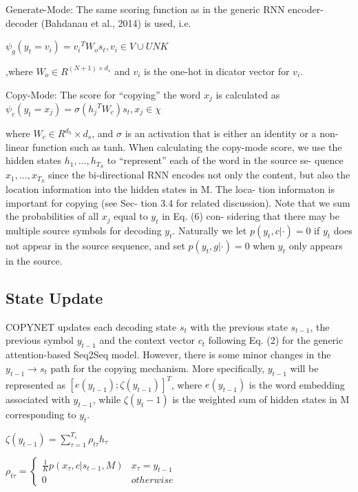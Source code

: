 \documentclass[UTF8]{ctexart}
\begin{document}
    Generate-Mode: The same scoring function as
    in the generic RNN encoder-decoder (Bahdanau et al., 2014) is used, i.e.
    
    $\psi_g(y_t = v_i) = {v_i}^T  W_o s_t, v_i \in  V \cup UNK $
    
    ,where $ W_o \in R^{(N+1)×d_s} $ and $v_i$  is the one-hot in dicator vector for $v_i$.

    Copy-Mode: The score for “copying” the word $x_j$ is calculated as
    $  \psi_c(y_t = x_j) = \sigma({h_j}^TW_c)s_t,x_j \in \chi    $

    where $W_c \in R^{d_h}×d_s$, and $\sigma$ is an activation
    that is either an identity or a non-linear function
    such as tanh. When calculating the copy-mode
    score, we use the hidden states ${h_1, ..., h_{T_S}}$ to
    “represent” each of the word in the source se-
    quence ${x_1, ..., x_{T_S}}$ since the bi-directional RNN
    encodes not only the content, but also the location
    information into the hidden states in M. The loca-
    tion informaton is important for copying (see Sec-
    tion 3.4 for related discussion). Note that we sum
    the probabilities of all $x_j$ equal to $y_t$ in Eq. (6) con-
    sidering that there may be multiple source symbols
    for decoding $y_t$. Naturally we let $p(y_t, c|·) = 0 $ if
    $y_t$ does not appear in the source sequence, and set
    $p(y_t, g|·) = 0$ when $y_t$ only appears in the source.


    \subsection{State Update}

    COPYNET updates each decoding state $s_t$ with
    the previous state $s_{t−1}$, the previous symbol $y_{t−1}$
    and the context vector $c_t$ following Eq. (2) for the
    generic attention-based Seq2Seq model. However,
    there is some minor changes in the $y_{t−1}→s_t$ path
    for the copying mechanism. More specifically,
    $y_{t−1}$ will be represented as $[e(y_{t−1}); \zeta (y_{t−1})]^T$,
    where $e(y_{t−1})$ is the word embedding associated
    with $y_{t−1}$, while $\zeta(y_t−1)$ is the weighted sum of
    hidden states in M corresponding to $y_t$.

    $ \zeta(y_{t-1})=\sum_{\tau =1}^{T_s}\rho_{t\tau}h_\tau$
    
    $  \rho_{t\tau}=\left\{
        \begin{matrix}
        \frac{1}{K}p(x_\tau,c|s_{t-1},M) & x_\tau = y_{t-1}\\
        0 & otherwise
        \end{matrix}
        \right.                                   $
\end{document}
